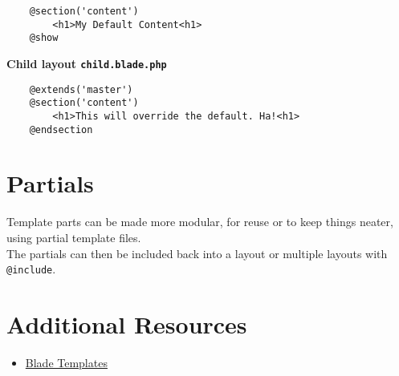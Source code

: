\begin{verbatim}
    @section('content')
        <h1>My Default Content<h1>
    @show
\end{verbatim}

\textbf{Child layout \texttt{child.blade.php}}
\begin{verbatim}
    @extends('master')
    @section('content')
        <h1>This will override the default. Ha!<h1>
    @endsection
\end{verbatim}

\section{Partials}

Template parts can be made more modular, for reuse or to keep things neater, using partial template files.
\\

The partials can then be included back into a layout or multiple layouts with \texttt{@include}.
\\

\section{Additional Resources}

\begin{itemize}[leftmargin=*]
    \item \href{http://laravel.com/docs/master/blade}{Blade Templates}
\end{itemize}
